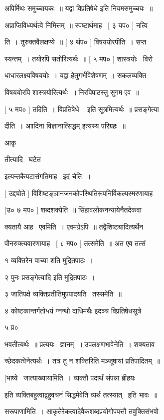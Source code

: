 \documentclass[11pt, openany]{book}
\begin{document}
अपिर्मिथः समुच्चायकः~॥ यद्वा विप्रतिषेधे इति नियमसमुच्चयः~॥ 

अप्राप्तिविध्यर्थत्वे निमित्तम्~॥ स्पष्टार्थमाह \textendash\ [ ३ यप० ] नत्वि \textendash\ 


ति~। तुरुक्तवैलक्षण्ये~॥ [ ४ र्थप० ] विषययोरपीति~। सप्त \textendash\ 

स्यन्तम्~। तयोरपि सतोरित्यर्थः~॥ [ ५ मप० ] शास्त्रयोः \textendash\ विरो \textendash\ 

{\qt धाधारलक्ष्यविषययोः~।} यद्वा हेतुगर्भविशेषणम्~। सकलव्यक्ति \textendash\ 

विषययोरपि शास्त्रयोरित्यर्थः~॥ निरपिपाठस्तु सुगम एव~॥ 

[ ५ मप० ] तदिति~। {\qt विप्रतिषेधे \textendash\ } इति सूत्रमित्यर्थः~॥
प्रसङ्गेत्या \textendash\ 

दीति~। आादिना {\qt विज्ञानात्सिद्धम्} इत्यस्य परिग्रहः~॥ {\qt आकृ \textendash\ 

तीत्यादि \textendash\ घटेत} इत्यन्तकैयटासंगतिमाह \textendash\ इदं चेति~॥ 

[ उद्द्योते ] विशिष्टङ्ञानजनकोपस्थितिरूपनिर्विकल्पस्मरणायाह \textendash\ 

[उ० ७ मप० ] शब्दशक्येति~॥ सिंहावलोकनन्यायेनैतदेकवा \textendash\ 

क्यतायै आह \textendash\ एवमिति~। एवमग्रेऽपि~॥ तद्वैशिष्ट्यादित्यर्थेन 

पौनरुक्त्यवारणायाह \textendash\ [ ८ मप० ] तत्समेति~॥ अत एव {\qt तत्सं} \textendash\ 



१ {\qt व्यक्तिरेन वाच्या} शति मुद्रितपाठः~। 

२ {\qt पुनः प्रसङ्गेत्यादि} इति मुद्रितपाठः~। 

३ जातिपक्षे व्यक्तिप्रतीतिमुपपादयति \textendash\ तस्समेति~॥ 

४ कोष्टकान्तर्गतो५यं ग्नन्थो दाधिमथैः {\qt इदञ्च विप्रतिषेधसूत्रे} 

५ प्र०





भवतीत्यर्थः~॥ प्रत्ययः \textendash\ ज्ञानम्~॥ उपलक्षणभावेनेति~। शक्यताव \textendash\ 

च्छेदकत्वेनेत्यर्थः~। तत्र तु न शक्तिरिति मञ्जूषायां प्रतिपादितम्~॥ 

[भाष्ये \textendash\ जात्याख्यायामिति~। व्यक्तौ पदार्थं {\qt संपन्ना ब्रीहयः} 

इति व्यक्तिबहुत्वाद्वहुवचनं सिद्धमेवेति व्यर्थ तत्स्यात् \textendash\ इति भावः~॥ 

सरूपाणामिति~। आकृतेरेकत्वादेवैकशब्दप्रयोगोपपत्तौ तवुक्तिसंभवो 
\end{document}
